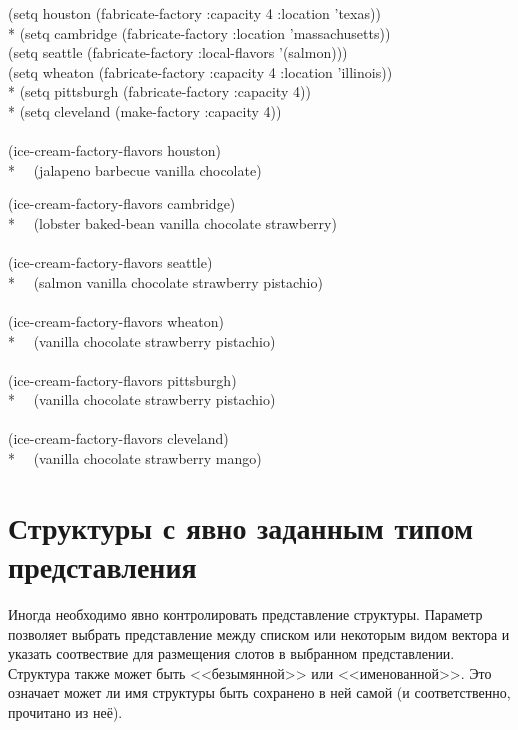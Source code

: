 \begin{new}
\begin{lisp}
(setq houston (fabricate-factory :capacity 4 :location 'texas)) \\*
(setq cambridge (fabricate-factory :location 'massachusetts)) \\
(setq seattle (fabricate-factory :local-flavors '(salmon))) \\
(setq wheaton (fabricate-factory :capacity 4 :location 'illinois)) \\*
(setq pittsburgh (fabricate-factory :capacity 4)) \\*
(setq cleveland (make-factory :capacity 4)) \\
 \\
(ice-cream-factory-flavors houston) \\*
~\EV~(jalapeno barbecue vanilla chocolate)
\end{lisp}
\newpage%
\begin{lisp}
(ice-cream-factory-flavors cambridge) \\*
~\EV~(lobster baked-bean vanilla chocolate strawberry) \\
\\
(ice-cream-factory-flavors seattle) \\*
~\EV~(salmon vanilla chocolate strawberry pistachio) \\
\\
(ice-cream-factory-flavors wheaton) \\*
~\EV~(vanilla chocolate strawberry pistachio) \\
\\
(ice-cream-factory-flavors pittsburgh) \\*
~\EV~(vanilla chocolate strawberry pistachio) \\
\\
(ice-cream-factory-flavors cleveland) \\*
~\EV~(vanilla chocolate strawberry mango)
\end{lisp}
\end{new}

\section{Структуры с явно заданным типом представления}
\label{EXPLICIT-TYPE-STRUCTURES}

Иногда необходимо явно контролировать представление структуры. Параметр
 позволяет выбрать представление между списком или некоторым видом
вектора и указать соотвествие для размещения слотов в выбранном представлении.
Структура также может быть <<безымянной>> или <<именованной>>. Это означает
может ли имя структуры быть сохранено в ней самой (и соответственно, прочитано
из неё).

